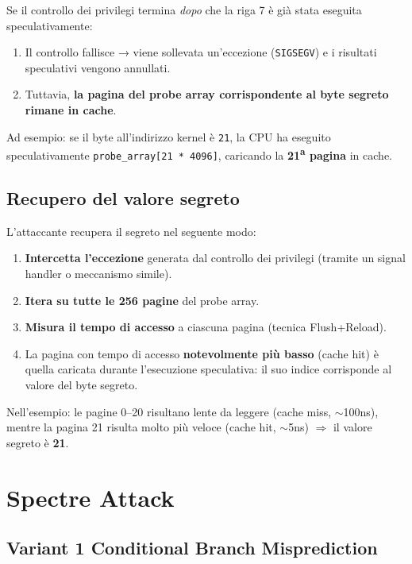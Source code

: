 \documentclass{article}
\begin{document}
Se il controllo dei privilegi termina \textit{dopo} che la riga 7 
è già stata eseguita speculativamente:
\begin{enumerate}
    \item Il controllo fallisce → viene sollevata un'eccezione 
    (\texttt{SIGSEGV}) e i risultati speculativi vengono annullati.
    \item Tuttavia, \textbf{la pagina del probe array corrispondente 
    al byte segreto rimane in cache}.
\end{enumerate}

Ad esempio: se il byte all'indirizzo kernel è \texttt{21}, la CPU 
ha eseguito speculativamente \texttt{probe\_array[21 * 4096]}, 
caricando la \textbf{21\textsuperscript{a} pagina} in cache.

\subsection*{Recupero del valore segreto}

L'attaccante recupera il segreto nel seguente modo:
\begin{enumerate}
    \item \textbf{Intercetta l'eccezione} generata dal controllo dei 
    privilegi (tramite un signal handler o meccanismo simile).
    \item \textbf{Itera su tutte le 256 pagine} del probe array.
    \item \textbf{Misura il tempo di accesso} a ciascuna pagina 
    (tecnica Flush+Reload).
    \item La pagina con tempo di accesso \textbf{notevolmente più 
    basso} (cache hit) è quella caricata durante l'esecuzione 
    speculativa: il suo indice corrisponde al valore del byte segreto.
\end{enumerate}

Nell'esempio: le pagine 0--20 risultano lente da leggere (cache miss, 
$\sim$100ns), mentre la pagina 21 risulta molto più veloce (cache hit, 
$\sim$5ns) $\Rightarrow$ il valore segreto è \textbf{21}.


\section*{Spectre Attack}

\subsection*{Variant 1 Conditional Branch Misprediction}
\end{document}
